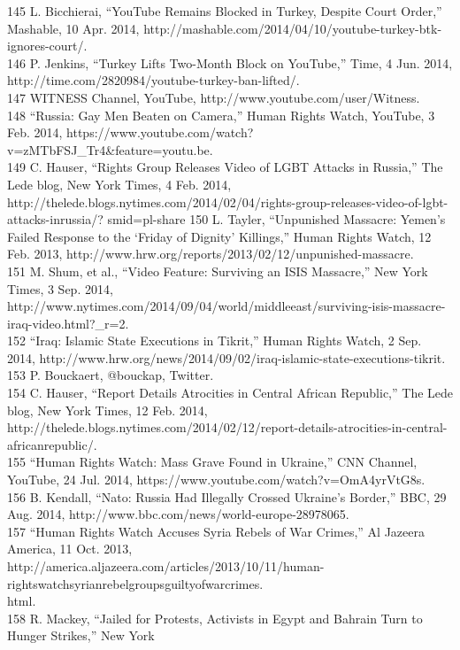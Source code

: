 145 L. Bicchierai, ``YouTube Remains Blocked in Turkey, Despite Court Order,'' Mashable, 10 Apr. 2014,
http://mashable.com/2014/04/10/youtube-turkey-btk-ignores-court/.\\
146 P. Jenkins, ``Turkey Lifts Two-Month Block on YouTube,'' Time, 4 Jun. 2014,
http://time.com/2820984/youtube-turkey-ban-lifted/.\\
147 WITNESS Channel, YouTube, http://www.youtube.com/user/Witness.\\
148 ``Russia: Gay Men Beaten on Camera,'' Human Rights Watch, YouTube, 3 Feb. 2014,
https://www.youtube.com/watch?v=zMTbFSJ_Tr4&feature=youtu.be.\\
149 C. Hauser, ``Rights Group Releases Video of LGBT Attacks in Russia,'' The Lede blog, New York Times,
4 Feb. 2014, http://thelede.blogs.nytimes.com/2014/02/04/rights-group-releases-video-of-lgbt-attacks-inrussia/?
smid=pl-share
150 L. Tayler, ``Unpunished Massacre: Yemen’s Failed Response to the ‘Friday of Dignity’ Killings,''
Human Rights Watch, 12 Feb. 2013, http://www.hrw.org/reports/2013/02/12/unpunished-massacre.\\
151 M. Shum, et al., ``Video Feature: Surviving an ISIS Massacre,'' New York Times, 3 Sep. 2014,
http://www.nytimes.com/2014/09/04/world/middleeast/surviving-isis-massacre-iraq-video.html?_r=2.\\
152 ``Iraq: Islamic State Executions in Tikrit,'' Human Rights Watch, 2 Sep. 2014,
http://www.hrw.org/news/2014/09/02/iraq-islamic-state-executions-tikrit.\\
153 P. Bouckaert, @bouckap, Twitter.\\
154 C. Hauser, ``Report Details Atrocities in Central African Republic,'' The Lede blog, New York Times, 12
Feb. 2014, http://thelede.blogs.nytimes.com/2014/02/12/report-details-atrocities-in-central-africanrepublic/.\\
155 ``Human Rights Watch: Mass Grave Found in Ukraine,'' CNN Channel, YouTube, 24 Jul. 2014,
https://www.youtube.com/watch?v=OmA4yrVtG8s.\\
156 B. Kendall, ``Nato: Russia Had Illegally Crossed Ukraine’s Border,'' BBC, 29 Aug. 2014,
http://www.bbc.com/news/world-europe-28978065.\\
157 ``Human Rights Watch Accuses Syria Rebels of War Crimes,'' Al Jazeera America, 11 Oct. 2013,
http://america.aljazeera.com/articles/2013/10/11/human-rightswatchsyrianrebelgroupsguiltyofwarcrimes.\\
html.\\
158 R. Mackey, ``Jailed for Protests, Activists in Egypt and Bahrain Turn to Hunger Strikes,'' New York
